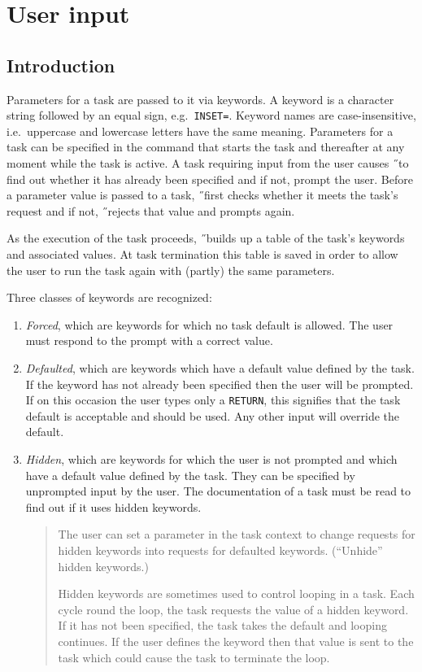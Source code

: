 \section{User input}
\subsection*{Introduction}
Parameters for a task are passed to it via keywords.
A keyword is a character string followed by an equal sign, e.g.\ {\tt INSET=}.
Keyword names are case-insensitive, i.e.\ uppercase and lowercase letters
have the same meaning.
Parameters for a task can be specified in the command that starts the task and
thereafter at any moment while the task is active.
A task requiring input from the user causes \H\ to find out whether it has
already been specified and if not, prompt the user.
Before a parameter value is passed to a task, \H\ first checks whether it
meets the task's request and if not, \H\ rejects that value and prompts again.

As the execution of the task
proceeds, \H\ builds up a table of the task's keywords and associated
values.
At task termination this table is saved in order to allow the user to
run the task again with (partly) the same parameters.

Three classes of keywords are recognized:
\begin{enumerate}
\item
{\em Forced\/}, which are keywords for which no task default is allowed.
The user must respond to the prompt with a correct value.
\item
{\em Defaulted\/},
which are keywords which have a default value defined by the
task. If the keyword has not already been specified then the user
will be prompted.
If on this occasion the user types only a {\tt RETURN}, this
signifies that the task default is acceptable and should be used. Any
other input will override the default.
\item
{\em Hidden\/},
which are keywords for which the user is not prompted and
which have a default value defined by the task.
They can be specified by unprompted input by the user.
The documentation of a task must be read to find out if it uses
hidden keywords.
\begin{quote}
\small The user can set a parameter in the task context to change requests
for hidden keywords into requests for defaulted keywords. (``Unhide'' hidden
keywords.)

Hidden keywords are sometimes used to control looping in a task.
Each cycle round the loop, the task requests the value of a hidden keyword.
If it has not been specified, the task takes the default and looping continues.
If the user defines the keyword then that value is sent to the task which
could cause the task to terminate the loop.
\end{quote}
\end{enumerate}

